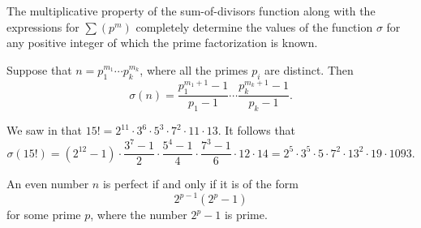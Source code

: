 The multiplicative property of the sum-of-divisors function along with the expressions for $\sum(p^m)$ completely determine the values of the function $\sigma$ for any positive integer of which the prime factorization is known.

\begin{corollary}
  Suppose that $n=p_1^{m_1}\cdots p_k^{m_k}$, where all the primes $p_i$ are distinct. Then
  \begin{equation*}
    \sigma(n)=\frac{p_1^{m_1+1}-1}{p_1-1}\cdots \frac{p_k^{m_k+1}-1}{p_k-1}.
  \end{equation*}
\end{corollary}

\begin{example}
  We saw in  that $15!=2^{11}\cdot 3^6\cdot 5^3\cdot 7^2 \cdot 11\cdot 13$. It follows that
  \begin{equation*}
    \sigma(15!)=(2^{12}-1)\cdot \frac{3^7-1}{2}\cdot \frac{5^4-1}{4}\cdot \frac{7^3-1}{6}\cdot 12\cdot 14=2^5\cdot 3^5\cdot 5\cdot 7^2 \cdot 13^2\cdot 19\cdot 1093.
  \end{equation*}
\end{example}

\begin{theorem}
  An even number $n$ is perfect if and only if it is of the form
  \begin{equation*}
    2^{p-1}(2^p-1)
  \end{equation*}
  for some prime $p$, where the number $2^p-1$ is prime.
\end{theorem}

